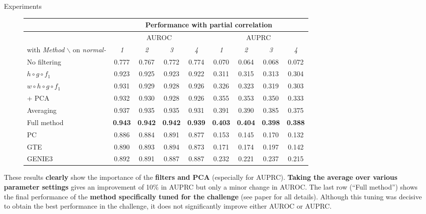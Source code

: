\documentclass[final]{beamer}
\begin{document}
\begin{frame}{}
\begin{textblock}{0.74}
\begin{block}{Experiments \phantom{p}}
\vspace{-5pt}
\begin{figure}
\centering
\tiny
\begin{tabular}{| l | c c c c | c c c c |}
\hline
& \multicolumn{8}{c|}{Performance with partial correlation}\\ \hline
& \multicolumn{4}{c|}{AUROC} & \multicolumn{4}{c|}{AUPRC} \\
with \textit{Method} $\backslash$ on \textit{normal-} & \textit{1} & \textit{2} & \textit{3} & \textit{4} & \textit{1} & \textit{2} & \textit{3} & \textit{4} \\
\hline
\hline
No  filtering       					& 0.777 & 0.767 & 0.772 & 0.774 & 0.070 & 0.064 & 0.068 & 0.072\\
$ h \circ g \circ f_1$                  & 0.923 & 0.925 & 0.923 & 0.922 & 0.311 & 0.315 & 0.313 & 0.304\\
$ w \circ h \circ g \circ f_1$          & 0.931 & 0.929 & 0.928 & 0.926 & 0.326 & 0.323 & 0.319 & 0.303\\
+ PCA         							& 0.932 & 0.930 & 0.928 & 0.926 & 0.355 & 0.353 & 0.350 & 0.333\\
Averaging           					& 0.937 & 0.935 & 0.935 & 0.931 & 0.391 &  0.390 &  0.385 & 0.375\\
Full method           					& \textbf{0.943} & \textbf{0.942} & \textbf{0.942} & \textbf{0.939} & \textbf{0.403} & \textbf{0.404} & \textbf{0.398} & \textbf{0.388}\\
\hline
PC & 0.886 & 0.884 & 0.891 &  0.877 & 0.153 & 0.145 & 0.170 & 0.132\\
GTE & 0.890 & 0.893 & 0.894 & 0.873 & 0.171 & 0.174 & 0.197 & 0.142\\
GENIE3 & 0.892 & 0.891 & 0.887 & 0.887 & 0.232 & 0.221 & 0.237 & 0.215 \\
\hline
\end{tabular}
\end{figure}

These results \textbf{clearly} show the importance of the \textbf{filters and PCA} (especially for AUPRC). \textbf{Taking the average over
various parameter settings} gives an improvement of 10\% in AUPRC but
only a minor change in AUROC. The last row (``Full method'') shows the
final performance of the \textbf{method specifically tuned for the challenge}
(see paper for all details). Although this
tuning was decisive to obtain the best performance in the challenge,
it does not significantly improve either AUROC or AUPRC.\\[1ex]


\end{block}
\end{textblock}
\end{frame}
\end{document}
